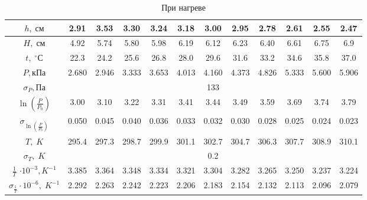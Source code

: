 \documentclass[a4paper,12pt]{article}
\begin{document}
\begin{enumerate}
\begin{center}
\begin{table}[h]
\begin{tabular}{|c|c|c|c|c|c|c|c|c|c|c|c|}
	\hline 
	$h ,\; {см}$  & 2.91 & 3.53 & 3.30 & 3.24 & 3.18  & 3.00 & 2.95  & 2.78  & 2.61  & 2.55  & 2.47 \\ 
	\hline 
	$H, \; {см}$ & 4.92  & 5.74  & 5.80 & 5.98 & 6.19 &  6.12 & 6.23  & 6.40  & 6.61  & 6.75  &  6.9 \\ 
	\hline 
	$t,\; ^\circ С$ & 22.3 & 24.2 & 25.6 & 26.8 & 28.0 & 29.6 & 31.6 & 33.2 & 34.6 & 35.8 & 37.0 \\
	\hline 
	$P, {кПа}$ & 2.680  & 2.946 & 3.333 & 3.653 & 4.013 & 4.160  & 4.373 & 4.826 & 5.333 & 5.600 & 5.906 \\ 
	\hline 
	$\sigma_{P}, {Па}$  & \multicolumn{11}{|c|}{133}  \\
	\hline 
	$\ln(\frac {P}{P_0})$  & 3.00 & 3.10 & 3.22  & 3.31 &3.41 & 3.44 & 3.49 & 3.59 & 3.69 & 3.74 & 3.79 \\ 
	\hline 
	$\sigma_{\ln(\frac {P}{P_0})}$ & 0.050 & 0.045 & 0.040 & 0.036& 0.033 & 0.032 & 0.030 & 0.028 &0.025  & 0.024 & 0.023 \\ 
	\hline
	$T,\; {K}$ & 295.4 & 297.3 & 298.7 & 299.9 & 301.1 & 302.7 & 304.7 & 306.3 & 307.7 & 308.9 & 310.1 \\
	\hline
	$\sigma_{T},\; {K}$ &\multicolumn{11}{|c|}{0.2} \\
	\hline 
	$\frac{1}{T}$ $\cdot 10^{-3},{K}^{-1}$ & 3.385  & 3.364 & 3.348 & 3.334 & 3.321 & 3.304 &3.282  & 3.265 & 3.250 & 3.237 & 3.224 \\ 
	\hline
	$\sigma_{\frac{1}{T}} \cdot 10^{-6},\; {K}^{-1}$ & 2.292 & 2.263  & 2.242 & 2.223 &  2.206 & 2.183 & 2.154 & 2.132 & 2.113& 2.096 & 2.079 \\
	\hline
\end{tabular}
	\caption{При нагреве}
\end{table}
\end{center}


\end{enumerate}
\end{document}
